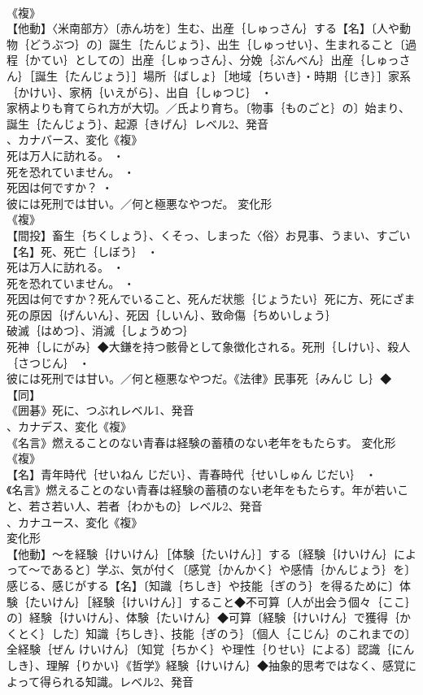 \documentclass[8pt]{extreport}
\begin{document}
\begin{CJK}{UTF8}{min}
\\	《複》
\\	【他動】〈米南部方〉〔赤ん坊を〕生む、出産｛しゅっさん｝する【名】〔人や動物｛どうぶつ｝の〕誕生｛たんじょう｝、出生｛しゅっせい｝、生まれること〔過程｛かてい｝としての〕出産｛しゅっさん｝、分娩｛ぶんべん｝出産｛しゅっさん｝［誕生｛たんじょう｝］場所｛ばしょ｝［地域｛ちいき｝・時期｛じき｝］家系｛かけい｝、家柄｛いえがら｝、出自｛しゅつじ｝ ・
\\	家柄よりも育てられ方が大切。／氏より育ち。〔物事｛ものごと｝の〕始まり、誕生｛たんじょう｝、起源｛きげん｝レベル2、発音
\\	、カナバース、変化《複》
\\	死は万人に訪れる。 ・
\\	死を恐れていません。 ・
\\	死因は何ですか？ ・
\\	彼には死刑では甘い。／何と極悪なやつだ。	変化形 
\\	《複》
\\	【間投】畜生｛ちくしょう｝、くそっ、しまった〈俗〉お見事、うまい、すごい【名】死、死亡｛しぼう｝ ・
\\	死は万人に訪れる。 ・
\\	死を恐れていません。 ・
\\	死因は何ですか？死んでいること、死んだ状態｛じょうたい｝死に方、死にざま
\\	死の原因｛げんいん｝、死因｛しいん｝、致命傷｛ちめいしょう｝
\\	破滅｛はめつ｝、消滅｛しょうめつ｝
\\	死神｛しにがみ｝◆大鎌を持つ骸骨として象徴化される。死刑｛しけい｝、殺人｛さつじん｝ ・
\\	彼には死刑では甘い。／何と極悪なやつだ。《法律》民事死｛みんじ し｝◆【同】
\\	《囲碁》死に、つぶれレベル1、発音
\\	、カナデス、変化《複》
\\	《名言》燃えることのない青春は経験の蓄積のない老年をもたらす。	変化形 
\\	《複》
\\	【名】青年時代｛せいねん じだい｝、青春時代｛せいしゅん じだい｝ ・
\\	《名言》燃えることのない青春は経験の蓄積のない老年をもたらす。年が若いこと、若さ若い人、若者｛わかもの｝レベル2、発音
\\	、カナユース、変化《複》
\\	変化形 
\\	【他動】～を経験｛けいけん｝［体験｛たいけん｝］する〔経験｛けいけん｝によって～であると〕学ぶ、気が付く〔感覚｛かんかく｝や感情｛かんじょう｝を〕感じる、感じがする【名】〔知識｛ちしき｝や技能｛ぎのう｝を得るために〕体験｛たいけん｝［経験｛けいけん｝］すること◆不可算〔人が出会う個々｛ここ｝の〕経験｛けいけん｝、体験｛たいけん｝◆可算〔経験｛けいけん｝で獲得｛かくとく｝した〕知識｛ちしき｝、技能｛ぎのう｝〔個人｛こじん｝のこれまでの〕全経験｛ぜん けいけん｝〔知覚｛ちかく｝や理性｛りせい｝による〕認識｛にんしき｝、理解｛りかい｝《哲学》経験｛けいけん｝◆抽象的思考ではなく、感覚によって得られる知識。レベル2、発音

\end{CJK}
\end{document}
